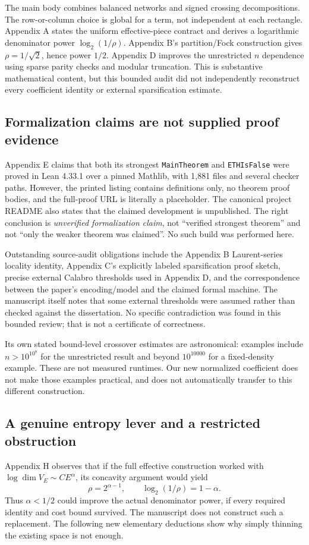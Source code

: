 \documentclass[11pt,letterpaper]{article}
\begin{document}
The main body combines balanced networks and signed crossing decompositions. The
row-or-column choice is global for a term, not independent at each rectangle.
Appendix A states the uniform effective-piece contract and derives a logarithmic denominator
power $\log_2(1/\rho)$. Appendix B's partition/Fock construction gives
$\rho=1/\sqrt2$, hence power $1/2$. Appendix D improves the unrestricted $n$ dependence
using sparse parity checks and modular truncation. This is substantive mathematical content,
but this bounded audit did not independently reconstruct every coefficient identity or
external sparsification estimate.

\subsection{Formalization claims are not supplied proof evidence}
Appendix E claims that both its strongest \texttt{MainTheorem} and \texttt{ETHIsFalse}
were proved in Lean 4.33.1 over a pinned Mathlib, with 1,881 files and several checker paths.
However, the printed listing contains definitions only, no theorem proof bodies, and the
full-proof URL is literally a placeholder. The canonical project README also states that
the claimed development is unpublished. The right conclusion is \emph{unverified formalization
claim}, not ``verified strongest theorem'' and not ``only the weaker theorem was claimed''.
No such build was performed here.

Outstanding source-audit obligations include the Appendix B Laurent-series locality identity,
Appendix C's explicitly labeled sparsification proof sketch, precise external Calabro thresholds
used in Appendix D, and the correspondence between the paper's encoding/model and the claimed
formal machine. The manuscript itself notes that some external thresholds were assumed rather
than checked against the dissertation. No specific contradiction was found in this bounded
review; that is not a certificate of correctness.

Its own stated bound-level crossover estimates are astronomical: examples include
$n>10^{10^8}$ for the unrestricted result and beyond $10^{10000}$ for a fixed-density example.
These are not measured runtimes. Our new normalized coefficient does not make those examples
practical, and does not automatically transfer to this different construction.

\subsection{A genuine entropy lever and a restricted obstruction}
Appendix H observes that if the full effective construction worked with
$\log\dim V_E\sim C E^\alpha$, its concavity argument would yield
\[
 \rho=2^{\alpha-1},\qquad \log_2(1/\rho)=1-\alpha.
\]
Thus $\alpha<1/2$ could improve the actual denominator power, if every required identity and
cost bound survived. The manuscript does not construct such a replacement.
The following new elementary deductions show why simply thinning the existing space is not enough.
\end{document}
